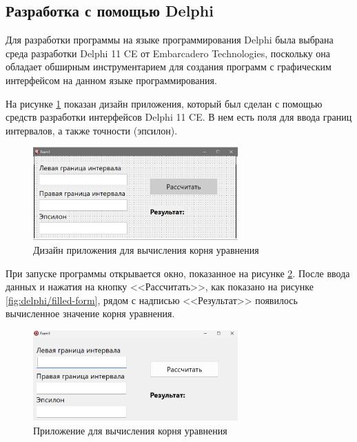 \documentclass[a4paper, 14pt]{extarticle}
\begin{document}
\subsection{Разработка с помощью Delphi}

Для разработки программы на языке программирования Delphi была выбрана среда
разработки Delphi 11 CE от Embarcadero Technologies, поскольку она обладает
обширным инструментарием для создания программ с графическим интерфейсом на
данном языке программирования.

На рисунке \ref{fig:delphi/design} показан дизайн приложения, который был
сделан с помощью средств разработки интерфейсов Delphi 11 CE. В нем есть
поля для ввода границ интервалов, а также точности (эпсилон).

\begin{figure}[H]
  \centering
  \includegraphics[width=0.7\textwidth]{images/delphi/design.png}
  \caption{Дизайн приложения для вычисления корня уравнения}
  \label{fig:delphi/design}
\end{figure}

При запуске программы открывается окно, показанное на рисунке
\ref{fig:delphi/empty-form}. После ввода данных и нажатия на кнопку <<Рассчитать>>,
как показано на рисунке \ref{fig:delphi/filled-form}, рядом с надписью
<<Результат>> появилось вычисленное значение корня уравнения.

\begin{figure}[H]
  \centering
  \includegraphics[width=0.7\textwidth]{images/delphi/empty-form.png}
  \caption{Приложение для вычисления корня уравнения}
  \label{fig:delphi/empty-form}
\end{figure}
\end{document}
